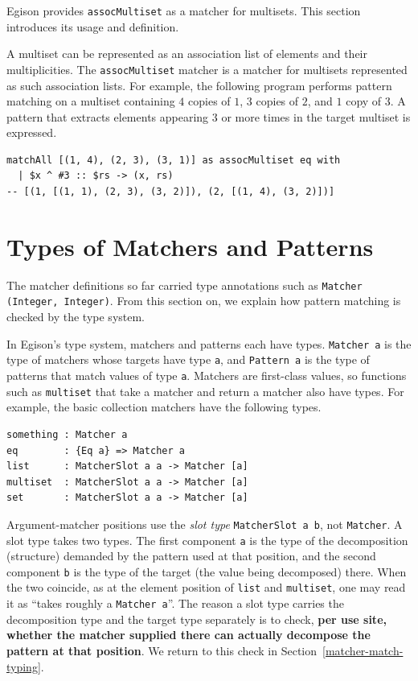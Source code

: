 Egison provides \lstinline{assocMultiset} as a matcher for multisets.
This section introduces its usage and definition.

A multiset can be represented as an association list of elements and their multiplicities.
The \lstinline{assocMultiset} matcher is a matcher for multisets represented as such association lists.
For example, the following program performs pattern matching on a multiset containing $4$ copies of $1$, $3$ copies of $2$, and $1$ copy of $3$.
A pattern that extracts elements appearing $3$ or more times in the target multiset is expressed.
\begin{lstlisting}[language=egison]
matchAll [(1, 4), (2, 3), (3, 1)] as assocMultiset eq with
  | $x ^ #3 :: $rs -> (x, rs)
-- [(1, [(1, 1), (2, 3), (3, 2)]), (2, [(1, 4), (3, 2)])]
\end{lstlisting}

\section{Types of Matchers and Patterns}\label{matcher-types}

The matcher definitions so far carried type annotations such as \lstinline{Matcher (Integer, Integer)}.
From this section on, we explain how pattern matching is checked by the type system.

In Egison's type system, matchers and patterns each have types.
\lstinline{Matcher a} is the type of matchers whose targets have type \lstinline{a}, and \lstinline{Pattern a} is the type of patterns that match values of type \lstinline{a}.
Matchers are first-class values, so functions such as \lstinline{multiset} that take a matcher and return a matcher also have types.
For example, the basic collection matchers have the following types.
\begin{lstlisting}[language=egison,numbers=none]
something : Matcher a
eq        : {Eq a} => Matcher a
list      : MatcherSlot a a -> Matcher [a]
multiset  : MatcherSlot a a -> Matcher [a]
set       : MatcherSlot a a -> Matcher [a]
\end{lstlisting}
Argument-matcher positions use the \emph{slot type} \lstinline{MatcherSlot a b}, not \lstinline{Matcher}.
A slot type takes two types.
The first component \lstinline{a} is the type of the decomposition (structure) demanded by the pattern used at that position, and the second component \lstinline{b} is the type of the target (the value being decomposed) there.
When the two coincide, as at the element position of \lstinline{list} and \lstinline{multiset}, one may read it as ``takes roughly a \lstinline{Matcher a}''.
The reason a slot type carries the decomposition type and the target type separately is to check, \textbf{per use site, whether the matcher supplied there can actually decompose the pattern at that position}.
We return to this check in Section~\ref{matcher-match-typing}.

